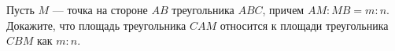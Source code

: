 \begin{ex}
	\begin{condition}
		Пусть \( M \) — точка на стороне \( AB\) треугольника \( ABC \), причем \( AM : MB = m : n \). Докажите, что площадь треугольника \( CAM \) относится к площади треугольника \( CBM \) как \( m : n \).
	\end{condition}
\end{ex}